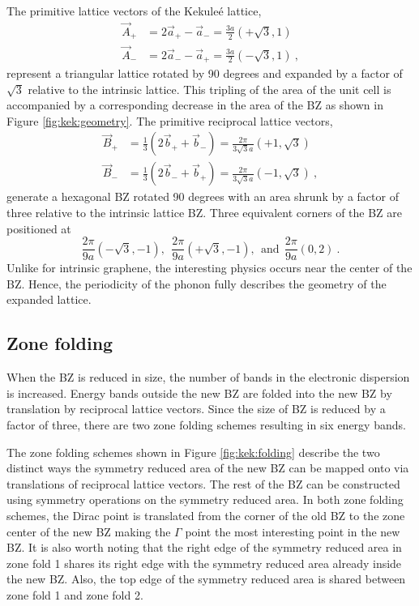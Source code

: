 The primitive lattice vectors of the Kekule\'e lattice,
\begin{align*}
	\vec{A}_+&=2 \vec{a}_+-\vec{a}_-=\frac{3 a}{2} (+\sqrt{3},1) \\
	\vec{A}_-&=2 \vec{a}_--\vec{a}_+=\frac{3 a}{2} (-\sqrt{3},1) \ ,
\end{align*}
represent a triangular lattice rotated by 90 degrees and expanded by a factor of $\sqrt{3}$ relative to the intrinsic lattice.
This tripling of the area of the unit cell is accompanied by a corresponding decrease in the area of the BZ as shown in Figure \ref{fig:kek:geometry}.
The primitive reciprocal lattice vectors,
\begin{align*}
	\vec{B}_+&=\frac{1}{3} (2\vec{b}_+ + \vec{b}_-)=\frac{2 \pi}{3 \sqrt{3} a}(+1,\sqrt{3}) \\
	\vec{B}_-&=\frac{1}{3} (2\vec{b}_- + \vec{b}_+)=\frac{2 \pi}{3 \sqrt{3} a}(-1,\sqrt{3}) \ ,
\end{align*}
generate a hexagonal BZ rotated 90 degrees with an area shrunk by a factor of three relative to the intrinsic lattice BZ.
Three equivalent corners of the BZ are positioned at
\begin{equation*}
	\frac{2 \pi}{9 a} (-\sqrt{3},-1), \ \ \frac{2 \pi}{9 a} (+\sqrt{3},-1), \ \ \textrm{and} \ \  \frac{2 \pi}{9 a} (0,2) \ .
\end{equation*}
Unlike for intrinsic graphene, the interesting physics occurs near the center of the BZ.
Hence, the periodicity of the phonon fully describes the geometry of the expanded lattice.

\subsection{Zone folding}
When the BZ is reduced in size, the number of bands in the electronic dispersion is increased.
Energy bands outside the new BZ are folded into the new BZ by translation by reciprocal lattice vectors.
Since the size of BZ is reduced by a factor of three, there are two zone folding schemes resulting in six energy bands.

The zone folding schemes shown in Figure \ref{fig:kek:folding} describe the two distinct ways the symmetry reduced area of the new BZ can be mapped onto via translations of reciprocal lattice vectors.
The rest of the BZ can be constructed using symmetry operations on the symmetry reduced area.
In both zone folding schemes, the Dirac point is translated from the corner of the old BZ to the zone center of the new BZ making the $\Gamma$ point the most interesting point in the new BZ.
It is also worth noting that the right edge of the symmetry reduced area in zone fold 1 shares its right edge with the symmetry reduced area already inside the new BZ.
Also, the top edge of the symmetry reduced area is shared between zone fold 1 and zone fold 2.

